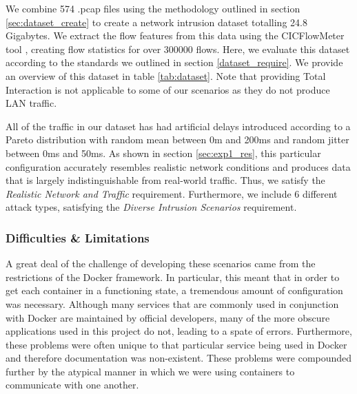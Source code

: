 \documentclass[msc,deptreport, cs]{infthesis} %
\begin{document}
We combine 574 .pcap files using the methodology outlined in section \ref{sec:dataset_create} to create a network intrusion dataset totalling 24.8 Gigabytes.  We extract the flow features from this data using the CICFlowMeter tool \cite{netflowmeter}, creating flow statistics for over 300000 flows. Here, we evaluate this dataset according to the standards we outlined in section \ref{dataset_require}. We provide an overview of this dataset in table \ref{tab:dataset}. Note that providing Total Interaction is not applicable to some of our scenarios as they do not produce LAN traffic.

All of the traffic in our dataset has had artificial delays introduced according to a Pareto distribution with random mean between 0m and 200ms and random jitter between 0ms and 50ms. As shown in section \ref{sec:exp1_res}, this particular configuration accurately resembles realistic network conditions and produces data that is largely indistinguishable from real-world traffic. Thus, we satisfy the \textit{Realistic Network and Traffic} requirement. Furthermore, we include 6 different attack types, satisfying the \textit{Diverse Intrusion Scenarios} requirement. 



\subsubsection{Difficulties \& Limitations}

A great deal of the challenge of developing these scenarios came from the restrictions of the Docker framework. In particular, this meant that in order to get each container in a functioning state, a tremendous amount of configuration was necessary. Although many services that are commonly used in conjunction with Docker are maintained by official developers, many of the more obscure applications used in this project do not, leading to a spate of errors. Furthermore, these problems were often unique to that particular service being used in Docker and therefore documentation was non-existent. These problems were compounded further by the atypical manner in which we were using containers to communicate with one another.
\end{document}
